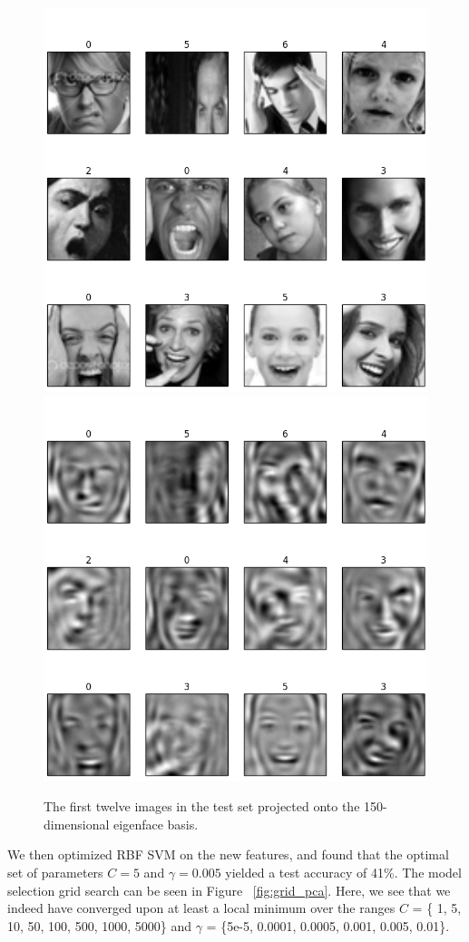\documentclass[10pt, twocolumn, twoside]{article}
\begin{document}
\begin{figure}[htb]
\centering
\includegraphics[width=0.8\linewidth]{original_test}
\includegraphics[width=0.8\linewidth]{projected_test}
\caption{\label{fig:pca} The first twelve images in the test set projected onto the
150-dimensional eigenface basis.}
\end{figure}

We then optimized RBF SVM on the new features, and found that the optimal set of
parameters $C=5$ and $\gamma = 0.005$ yielded a test accuracy of 41\%. The model
selection grid search can be seen in Figure ~\ref{fig:grid_pca}. Here, we see that
we indeed have converged upon at least a local minimum over the ranges $C$ = \{
1, 5, 10, 50, 100, 500, 1000, 5000\} and $\gamma$ = \{5e-5, 0.0001, 0.0005, 0.001,
0.005, 0.01\}.
\end{document}
